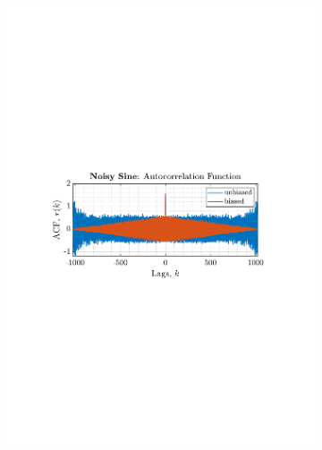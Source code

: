 \documentclass[12pt]{article}
\numberwithin{equation}{section}
\begin{document}
	\begin{figure}[H]
		\centering
		\begin{subfigure}{0.49\textwidth}
			\centering
			\includegraphics[trim={2.2cm 11cm 3.15cm  11.2cm}, clip, width=\textwidth]{../MATLAB/figures/q1_3a_fig04.pdf} 
		\end{subfigure}
		\begin{subfigure}{0.49\textwidth}
			\centering

\end{subfigure}
\end{figure}
\end{document}
